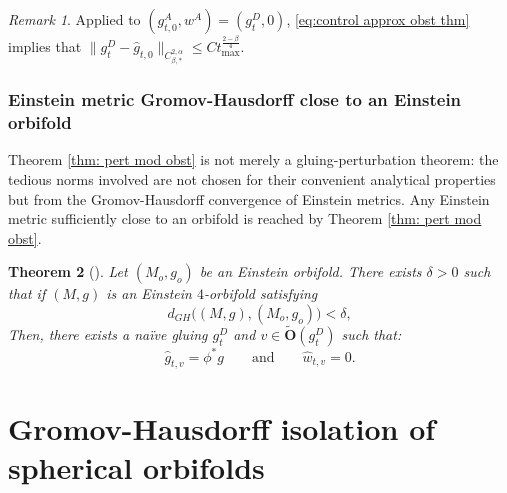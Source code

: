 \documentclass[11pt,reqno]{amsart}
\numberwithin{equation}{section}
\newtheorem{thm}{Theorem}[section]
\theoremstyle{definition}
\theoremstyle{remark}
\newtheorem{remark}[thm]{Remark}
\begin{document}
\begin{remark}
    Applied to $(g^A_{t ,0 },w^A)=(g^D_t,0)$, \eqref{eq:control approx obst thm} implies that $\|g^D_t-\hat g_{t ,0 } \|_{C^{2,\alpha}_{\beta,*}}\leqslant Ct_{\max}^{\frac{2-\beta}{4}}$.
\end{remark}
\subsubsection{Einstein metric Gromov-Hausdorff close to an Einstein orbifold}


Theorem \ref{thm: pert mod obst} is not merely a gluing-perturbation theorem: the tedious norms involved are not chosen for their convenient analytical properties but from the Gromov-Hausdorff convergence of Einstein metrics. Any Einstein metric sufficiently close to an orbifold is reached by Theorem \ref{thm: pert mod obst}.

\begin{thm}[{\cite{ozu1,ozu2}}]\label{thm: exhaustion neighb orb}
   Let $(M_o,g_o)$ be an Einstein orbifold. There exists $\delta>0$ such that if $(M,g)$ is an Einstein $4$-\textit{orbifold} satisfying 
$$d_{GH}\big((M,g),(M_o,g_o)\big)<\delta,$$ 
Then, there exists a naïve gluing $g^D_{t }$ and $ v \in \tilde{\mathbf{O}}(g^D_{t  })$ such that:
$$\hat{g}_{t,v} = \phi^*g\qquad \text{and}\qquad \hat{w}_{t,v} = 0.$$
\end{thm}

\section{Gromov-Hausdorff isolation of spherical orbifolds}\label{sec:GH isolation}
\end{document}

